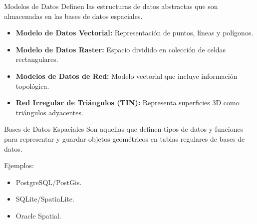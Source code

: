 \begin{frame}[c]{Modelos de Datos}
	Definen las estructuras de datos abstractas que son almacenadas en las bases de datos espaciales.
	\vspace{\baselineskip}
	\begin{itemize}	
		\item \textbf{Modelo de Datos Vectorial:} Representación de puntos, líneas y polígonos.	
		\item \textbf{Modelo de Datos Raster:} Espacio dividido en colección de celdas
		rectangulares.
		\item \textbf{Modelos de Datos de Red:} Modelo vectorial que incluye información topológica.
		\item \textbf{Red Irregular de Triángulos (TIN):} Representa superficies 3D como triángulos adyacentes.
	\end{itemize}			
\end{frame}


\begin{frame}[c]{Bases de Datos Espaciales}
	Son aquellas que definen tipos de datos y funciones para representar y guardar objetos geométricos en tablas regulares de bases de datos.

	\vspace{\baselineskip}
	Ejemplos:

	\vspace{\baselineskip}
	\begin{itemize}	 	
		\item PostgreSQL/PostGis.	
		\item SQLite/SpatiaLite.
		\item Oracle Spatial.
	\end{itemize}			
\end{frame}

